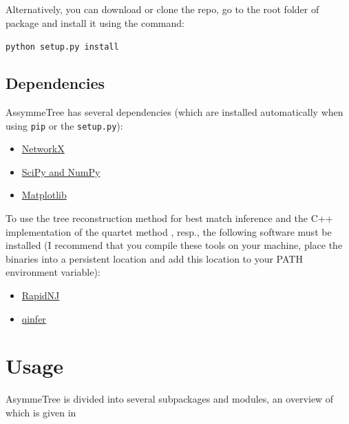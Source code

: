 \documentclass[hidelinks,11pt]{article}
\newcommand{\COMMANDLINE}[1]{\begingroup\par\vspace{3mm}\color{darkgrey}\begin{adjustwidth}{1cm}{1cm}\texttt{#1}\end{adjustwidth}\vspace{3mm}\endgroup}
\begin{document}
Alternatively, you can download or clone the repo, go to the root folder of package and install it using the command:

\COMMANDLINE{python setup.py install}


\subsection{Dependencies}

AssymmeTree has several dependencies (which are installed automatically when using \texttt{pip} or the \texttt{setup.py}):

\begin{itemize}
	\item \href{https://networkx.github.io}{NetworkX}
	\item \href{http://www.scipy.org/install.html}{SciPy and NumPy}
	\item \href{https://matplotlib.org/}{Matplotlib}
\end{itemize}

To use the tree reconstruction method for best match inference and the C++ implementation of the quartet method \citep{stadler2020}, resp., the following software must be installed
(I recommend that you compile these tools on your machine, place the binaries into a persistent location and add this location to your PATH environment variable):

\begin{itemize}
	\item \href{https://birc.au.dk/software/rapidnj/}{RapidNJ} \citep{simonsen2008}
	\item \href{https://github.com/david-schaller/qinfer}{qinfer}
\end{itemize}


\newpage

\section{Usage}

AsymmeTree is divided into several subpackages and modules, an overview of which is given in 
\end{document}
